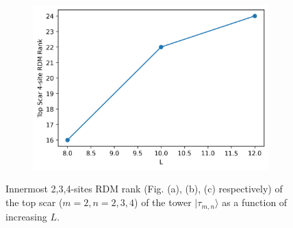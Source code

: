\documentclass[11pt]{article}
\begin{document}
\begin{itemize}
\begin{itemize}
\begin{figure}[H]
\begin{subfigure}{0.45\textwidth}
        \includegraphics[width=\linewidth]{hb_scar_4t.png}
        \caption{}
        \label{fig:image3hb}
    \end{subfigure}

    \caption{Innermost 2,3,4-sites RDM rank (Fig. (a), (b), (c) respectively) of the top scar ($m=2, n=2,3,4$) of the tower $|\tau_{m,n}\rangle$ as a function of increasing $L$.}
    \label{fig:hb_scars_tower}
\end{figure}


\end{itemize}
\end{itemize}
\end{document}
